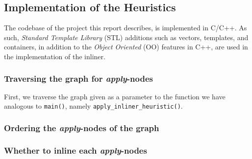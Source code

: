 \subsection{Implementation of the Heuristics}

The codebase of the project this report describes, is implemented in C/C++. As
such, \textit{Standard Template Library} (STL) additions such as vectors,
templates, and containers, in addition to the \textit{Object Oriented} (OO)
features in C++, are used in the implementation of the inliner.

\subsubsection{Traversing the graph for \textit{apply}-nodes}

First, we traverse the graph given as a parameter to the function we have
analogous to \lstinline!main()!, namely \lstinline!apply_inliner_heuristic()!.

\subsubsection{Ordering the \textit{apply}-nodes of the graph}

\subsubsection{Whether to inline each \textit{apply}-nodes}
